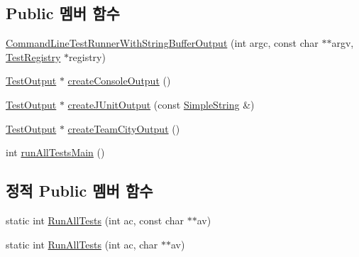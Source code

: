 \subsection*{Public 멤버 함수}
\begin{DoxyCompactItemize}
\item 
\hyperlink{class_command_line_test_runner_with_string_buffer_output_adcf201c943b28b7dc6ff06d69c8ba9ac}{Command\+Line\+Test\+Runner\+With\+String\+Buffer\+Output} (int argc, const char $\ast$$\ast$argv, \hyperlink{class_test_registry}{Test\+Registry} $\ast$registry)
\item 
\hyperlink{class_test_output}{Test\+Output} $\ast$ \hyperlink{class_command_line_test_runner_with_string_buffer_output_a9d2673d18a753ae29e0a7e55c7e27089}{create\+Console\+Output} ()
\item 
\hyperlink{class_test_output}{Test\+Output} $\ast$ \hyperlink{class_command_line_test_runner_with_string_buffer_output_a1e186370476e3953ab58a03788eb2ef4}{create\+J\+Unit\+Output} (const \hyperlink{class_simple_string}{Simple\+String} \&)
\item 
\hyperlink{class_test_output}{Test\+Output} $\ast$ \hyperlink{class_command_line_test_runner_with_string_buffer_output_a9cbd57b1dce8e07f82ed74f48ef8fdb1}{create\+Team\+City\+Output} ()
\item 
int \hyperlink{class_command_line_test_runner_ae2d295539b64a4d4ea8649fb193c917e}{run\+All\+Tests\+Main} ()
\end{DoxyCompactItemize}
\subsection*{정적 Public 멤버 함수}
\begin{DoxyCompactItemize}
\item 
static int \hyperlink{class_command_line_test_runner_a20babba9f8fa7e8e2bfa1283fc928b33}{Run\+All\+Tests} (int ac, const char $\ast$$\ast$av)
\item 
static int \hyperlink{class_command_line_test_runner_a6964f1801c3f7ea1fc475970e8495b40}{Run\+All\+Tests} (int ac, char $\ast$$\ast$av)
\end{DoxyCompactItemize}
